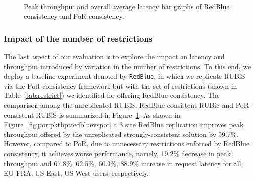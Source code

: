 \begin{figure}[t!]
\centering

\\
\caption{Peak throughput and overall average latency bar graphs of RedBlue consistency and PoR consistency.}
\label{fig:por:redbluevspor}
\end{figure}

\subsubsection{Impact of the number of restrictions}
The last aspect of our evaluation is to explore the impact on latency and throughput introduced by variation in the number
of restrictions. To this end, we deploy a baseline experiment denoted by {\tt RedBlue}, in which
we replicate RUBiS via the PoR consistency framework but with the set of restrictions (shown in Table~\ref{tab:restrict}) we identified for offering
RedBlue consistency. The comparison among the unreplicated RUBiS, RedBlue-consistent RUBiS
and PoR-consistent RUBiS is summarized in Figure~\ref{fig:por:redbluevspor}. As shown in Figure~\ref{fig:por:pkthptredbluevspor}
a 3 site RedBlue replication
improves peak throughput offered by the unreplicated strongly-consistent solution by 99.7\%. However, compared to
PoR, due to unnecessary restrictions enforced by RedBlue consistency, it achieves worse performance, namely, 19.2\% decrease in peak throughput
and 67.8\%, 62.5\%, 60.0\%, 88.9\% increase in request latency for all, EU-FRA, US-East, US-West users, respectively.





